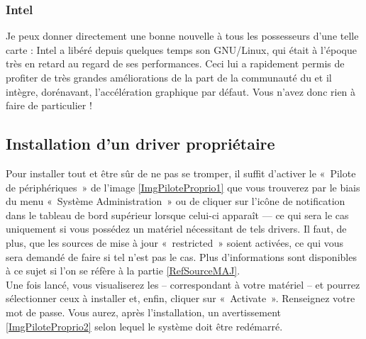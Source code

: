 \subsubsection{Intel}
Je peux donner directement une bonne nouvelle à tous les possesseurs d'une telle carte : Intel a libéré depuis quelques temps son  GNU/Linux, qui était à l'époque très en retard au regard de ses performances. Ceci lui a rapidement permis de profiter de très grandes améliorations de la part de la communauté du  et il intègre, dorénavant, l'accélération graphique par défaut. Vous n'avez donc rien à faire de particulier !
\subsection{Installation d'un driver propriétaire}
\label{RefInstallDriverProprietaire}
Pour installer tout   et être sûr de ne pas se tromper, il suffit d'activer le «~Pilote de périphériques~» de l'image \ref{ImgPiloteProprio1} que vous trouverez par le biais du menu «~Système \FlecheDroite Administration~» ou de cliquer sur l'icône de notification dans le tableau de bord supérieur lorsque celui-ci apparaît --- ce qui sera le cas uniquement si vous possédez un matériel nécessitant de tels drivers. Il faut, de plus, que les sources de mise à jour «~restricted~» soient activées, ce qui vous sera demandé de faire si tel n'est pas le cas. Plus d'informations sont disponibles à ce sujet si l'on se réfère à la partie \ref{RefSourceMAJ}.\\
Une fois lancé, vous visualiserez les   -- correspondant à votre matériel -- et pourrez sélectionner ceux à installer et, enfin, cliquer sur «~Activate~». Renseignez votre mot de passe. Vous aurez, après l'installation, un avertissement \ref{ImgPiloteProprio2} selon lequel le système doit être redémarré.
\PiloteProprio
